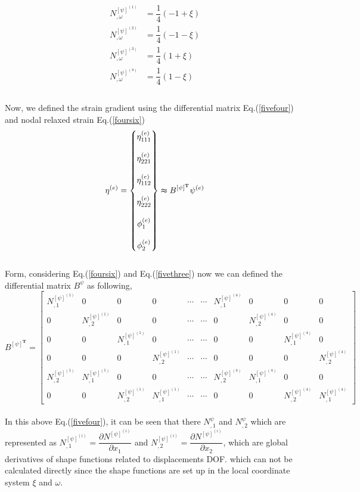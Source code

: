 \documentclass[12pt]{article}
\begin{document}
\begin{equation}
\begin{aligned}
N_{,\omega}^{[\psi]^{(1)}} &= \dfrac{1}{4}(-1+\xi) \\
N_{,\omega}^{[\psi]^{(2)}} &= \dfrac{1}{4}(-1-\xi) \\
N_{,\omega}^{[\psi]^{(3)}} &= \dfrac{1}{4}(1+\xi) \\
N_{,\omega}^{[\psi]^{(4)}} &= \dfrac{1}{4}(1-\xi) \\
\end{aligned}
\end{equation}
\\
Now, we defined the strain gradient using the differential matrix Eq.(\ref{fivefour}) and nodal relaxed strain Eq.(\ref{foursix})  
\begin{equation}\label{fivethree}
\eta^{(e)}=
\begin{Bmatrix}
	\eta_{111}^{(e)} \\
	\\
	\eta_{221}^{(e)} \\
	\\
	\eta_{112}^{(e)} \\
	\\
	\eta_{222}^{(e)} \\
	\\
	\phi_{1}^{(e)} \\
	\\
	\phi_{2}^{(e)}
\end{Bmatrix}
\thickapprox B^{[\psi]^{\textbf{T}}}\psi^{(e)}
\end{equation}
\\
Form, considering Eq.(\ref{foursix}) and Eq.(\ref{fivethree}) now we can defined the differential matrix $B^\psi$ as following,
\begin{equation}\label{fivefour}
B^{[\psi]^\textbf{T}}=
\begin{bmatrix}
N_{,1}^{{[\psi]}^{(1)}}&0&0&0&\cdots&\cdots&N_{,1}^{{[\psi]}^{(4)}}&0&0&0 \\
0&N_{,2}^{{[\psi]}^{(1)}}&0&0&\cdots&\cdots&0&N_{,2}^{{[\psi]}^{(4)}}&0&0 \\
0&0&N_{,1}^{{[\psi]}^{(1)}}&0&\cdots&\cdots&0&0&N_{,1}^{{[\psi]}^{(4)}}&0 \\
0&0&0&N_{,2}^{{[\psi]}^{(1)}}&\cdots&\cdots&0&0&0&N_{,2}^{{[\psi]}^{(4)}} \\
N_{,2}^{{[\psi]}^{(1)}}&N_{,1}^{{[\psi]}^{(1)}}&0&0&\cdots&\cdots&N_{,2}^{{[\psi]}^{(4)}}&N_{,1}^{{[\psi]}^{(4)}}&0&0 \\
0&0&N_{,2}^{{[\psi]}^{(1)}}&N_{,1}^{{[\psi]}^{(1)}}&\cdots&\cdots&0&0&N_{,2}^{{[\psi]}^{(4)}}&N_{,1}^{{[\psi]}^{(4)}} 
\end{bmatrix}
\end{equation}
\\
In this above Eq.(\ref{fivefour}), it can be seen that there $N_{,1}^\psi$ and $N_{,2}^\psi$ which are represented as $N_{,1}^{[\psi]^{(i)}} = \dfrac{\partial N^{[\psi]^{(i)}}}{\partial x_1}$ and $N_{,2}^{[\psi]^{(i)}} = \dfrac{\partial N^{[\psi]^{(i)}}}{\partial x_2}$, which are global derivatives of shape functions related to displacements DOF. which can not be calculated directly since the shape functions are set up in the local coordinate system $ \xi$ and $ \omega$.
\end{document}
